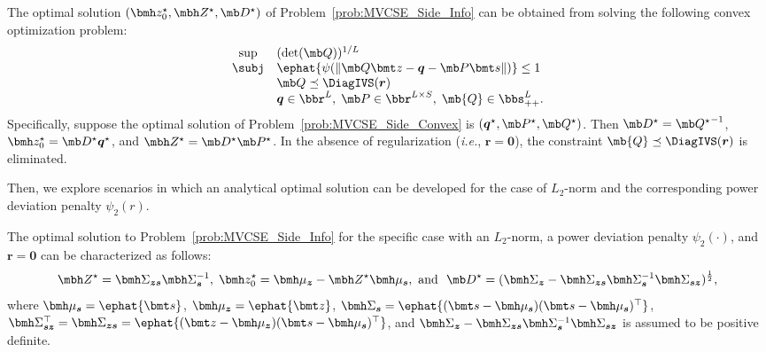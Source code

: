 \documentclass[opre, blindrev]{informs4}
\newcommand{\1}[1]{\mathds{1}{\left(#1\right)}}
\begin{document}
\begin{theorem}\label{thm:sideinfo}
The optimal solution $(\bmh z_0^\star, \mbh Z^\star, \mb D^\star)$ of Problem~\eqref{prob:MVCSE_Side_Info} can be obtained from solving the following convex optimization problem:
\begin{equation}\label{prob:MVCSE_Side_Convex}
\begin{array}{cll}
\sup & (\det(\mb Q))^{1/L} \\
\subj & \ephat{\psi(\| \mb Q \bmt z - \bm q - \mb P \bmt s \|)} \leq 1 \\
& \mb Q \preceq \DiagIVS(\bm r) \\
& \bm q \in \bbr^L, \; \mb P \in \bbr^{L \times S}, \; \mb{Q} \in \bbs^{L}_{++}. 
\end{array} 
\end{equation}
Specifically, suppose the optimal solution of Problem~\eqref{prob:MVCSE_Side_Convex} is $(\bm q^\star, \mb P^\star, \mb Q^\star)$. Then $\mb D^\star = {\mb Q^\star}^{-1}$, $\bmh z_0^\star = \mb D^\star \bm q^\star$, and $\mbh Z^\star = \mb D^\star \mb P^\star$. In the absence of regularization (\textit{i.e.}, $\bm r =\bm 0$), the constraint $\mb{Q} \preceq \DiagIVS(\bm r)$ is eliminated.  
\end{theorem}

Then, we explore scenarios in which an analytical optimal solution can be developed for the case of $L_2$-norm and the corresponding power deviation penalty $\psi_2(r)$. 
\begin{theorem}
\label{chap8:thm:MVCSESideInformationL2}
The optimal solution to Problem~\eqref{prob:MVCSE_Side_Info} for the specific case with an $L_2$-norm, a power deviation penalty $\psi_2(\cdot)$, and $\bm r = \bm 0$ can be characterized as follows:
$$
\mbh Z^\star = \bmh \Sigma_{\bm z \bm s} \mbh \Sigma_{\bm s}^{-1}, \; \bmh z_0^\star = \bmh \mu_{\bm z} - \mbh Z^\star \bmh \mu_{\bm s}, ~\text{and}~~ \mb D^\star = (\bmh \Sigma_{\bm z} - \bmh \Sigma_{\bm z \bm s} \bmh \Sigma_{\bm s}^{-1} \bmh \Sigma_{\bm s \bm z})^{\frac{1}{2}},
$$
where ${\bmh \mu_{\bm s}} = \ephat{\bmt s}$, $\bmh \mu_{\bm z}= \ephat{\bmt z}$,  
$\bmh \Sigma_{\bm s} = \ephat{ (\bmt s - \bmh \mu_{\bm s} ) (\bmt s - \bmh \mu_{\bm s})^\top}$, $\bmh \Sigma_{\bm s\bm z}^\top = \bmh \Sigma_{\bm z\bm s} = \ephat{ (\bmt z - \bmh \mu_{\bm z}) (\bmt s - \bmh \mu_{\bm s})^\top}$, and $\bmh \Sigma_{\bm z} - \bmh \Sigma_{\bm z \bm s} \bmh \Sigma_{\bm s}^{-1} \bmh \Sigma_{\bm s \bm z}$ is assumed to be positive definite.
\end{theorem}
\end{document}
